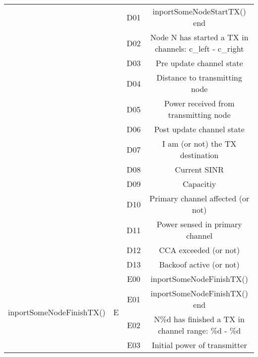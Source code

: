 \documentclass[a4paper]{article}
\begin{document}
\begin{table}[h!]
\begin{tabular}{|c|c|c|c|}
		&                     & D01               & inportSomeNodeStartTX() end                             \\ \cline{3-4} 
		&                     & D02               & Node N has started a TX in channels: c\_left - c\_right \\ \cline{3-4} 
		&                     & D03               & Pre update channel state                                \\ \cline{3-4} 
		&                     & D04               & Distance to transmitting node                           \\ \cline{3-4} 
		&                     & D05               & Power received from transmitting node                   \\ \cline{3-4} 
		&                     & D06               & Post update channel state                               \\ \cline{3-4} 
		&                     & D07               & I am (or not) the TX destination                        \\ \cline{3-4} 
		&                     & D08               & Current SINR                                            \\ \cline{3-4} 
		&                     & D09               & Capacitiy                                               \\ \cline{3-4} 
		&                     & D10               & Primary channel affected (or not)                       \\ \cline{3-4} 
		&                     & D11               & Power sensed in primary channel                         \\ \cline{3-4} 
		&                     & D12               & CCA exceeded (or not)                                   \\ \cline{3-4} 
		&                     & D13               & Backoof active (or not)                                 \\ \hline
		\multirow{10}{*}{inportSomeNodeFinishTX()} & \multirow{10}{*}{E} & E00               & inportSomeNodeFinishTX()                                \\ \cline{3-4} 
		&                     & E01               & inportSomeNodeFinishTX() end                            \\ \cline{3-4} 
		&                     & E02               & N\%d has finished a TX in channel range: \%d - \%d      \\ \cline{3-4} 
		&                     & E03               & Initial power of transmitter                            \\ \cline{3-4} 

\end{tabular}
\end{table}
\end{document}
